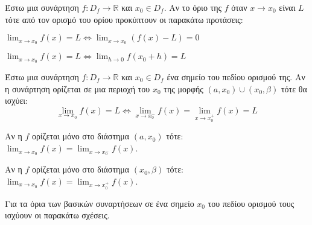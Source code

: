 \documentclass[twoside,nofonts,ektypwsh,math,spyros]{frontisthrio}
\begin{document}
\thewrhmata
{}
Έστω μια συνάρτηση $ f:D_f\to\mathbb{R} $ και $ x_0\in D_f $. Αν το όριο της $ f $ όταν $ x\to x_0 $ είναι $ L $ τότε από τον ορισμό του ορίου προκύπτουν οι παρακάτω προτάσεις:
\begin{rlist}
\item $ \lim_{x\to x_0}{f(x)}=L\Leftrightarrow \lim_{x\to x_0}{(f(x)-L)}=0 $
\item $ \lim_{x\to x_0}{f(x)}=L\Leftrightarrow \lim_{h\to 0}{f(x_0+h)}=L $
\end{rlist}
Έστω μια συνάρτηση $ f:D_f\to \mathbb{R} $ και $ x_0\in D_f $ ένα σημείο του πεδίου ορισμού της. Αν η συνάρτηση ορίζεται σε μια περιοχή του $ x_0 $ της μορφής $ (a,x_0)\cup(x_0,\beta) $ τότε θα ισχύει:
\[ \lim_{x\to x_0}{f(x)}=L\Leftrightarrow \lim_{x\to x_0^-}{f(x)}=\lim_{x\to x_0^+}{f(x)}=L \]
\begin{rlist}
\item Αν η $ f $ ορίζεται μόνο στο διάστημα $ (a,x_0) $ τότε: $ \lim_{x\to x_0}{f(x)}=\lim_{x\to x_0^-}{f(x)} $.
\item Αν η $ f $ ορίζεται μόνο στο διάστημα $ (x_0,\beta) $ τότε: $ \lim_{x\to x_0}{f(x)}=\lim_{x\to x_0^+}{f(x)} $.
\end{rlist}
Για τα όρια των βασικών συναρτήσεων σε ένα σημείο $ x_0 $ του πεδίου ορισμού τους ισχύουν οι παρακάτω σχέσεις.
\end{document}
